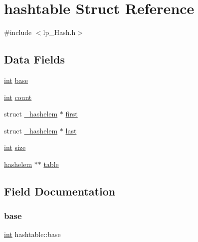 \hypertarget{structhashtable}{}\section{hashtable Struct Reference}
\label{structhashtable}


{\ttfamily \#include $<$lp\+\_\+\+Hash.\+h$>$}

\subsection*{Data Fields}
\begin{DoxyCompactItemize}
\item 
\hyperlink{lp__lib_8h_adeb9ec6400320e4923ac9d836d509ddb}{int} \hyperlink{structhashtable_a47539ce3cdaf043c42cd2195be6d537a}{base}
\item 
\hyperlink{lp__lib_8h_adeb9ec6400320e4923ac9d836d509ddb}{int} \hyperlink{structhashtable_a849d7b9cab945feabe177cd5e61f46a7}{count}
\item 
struct \hyperlink{struct__hashelem}{\+\_\+hashelem} $\ast$ \hyperlink{structhashtable_a7469fff709a4b9b9ee801a656c79d9b4}{first}
\item 
struct \hyperlink{struct__hashelem}{\+\_\+hashelem} $\ast$ \hyperlink{structhashtable_a769438ba5b3d875ce6e3322afe843179}{last}
\item 
\hyperlink{lp__lib_8h_adeb9ec6400320e4923ac9d836d509ddb}{int} \hyperlink{structhashtable_ab62bd10297b090cfce7d728fd650e51d}{size}
\item 
\hyperlink{lp___hash_8h_a27375934623e0b5c611bb7ba867cc99f}{hashelem} $\ast$$\ast$ \hyperlink{structhashtable_a097815b109b5896f483851b347f7a165}{table}
\end{DoxyCompactItemize}


\subsection{Field Documentation}
\mbox{\label{structhashtable_a47539ce3cdaf043c42cd2195be6d537a}} 
\subsubsection{\texorpdfstring{base}{base}}
{\footnotesize\ttfamily \hyperlink{lp__lib_8h_adeb9ec6400320e4923ac9d836d509ddb}{int} hashtable\+::base}

